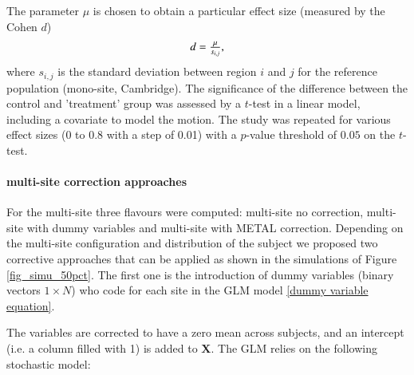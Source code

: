\documentclass[authoryear]{elsarticle}
\begin{document}
The parameter $\mu$ is chosen to obtain a particular effect size (measured by the Cohen $d$)
\begin{equation}\label{cohen's d}
    \begin{array}{l l}
      d = \frac{\mu}{s_{i,j}},      
    \end{array}
\end{equation}
where $s_{i,j}$ is the standard deviation between region $i$ and $j$ for the reference population (mono-site, Cambridge). The significance of the difference between the control and 'treatment' group was assessed by a $t$-test in a linear model, including a covariate to model the motion. The study was repeated for various effect sizes (0 to 0.8 with a step of 0.01) with a $p$-value threshold of $0.05$ on the $t$-test.


\paragraph{multi-site correction approaches} 

For the multi-site three flavours were computed: multi-site no correction, multi-site with dummy variables and multi-site with METAL correction.
Depending on the multi-site configuration and distribution of the subject we proposed two corrective approaches that can be applied as shown in the simulations of Figure \ref{fig_simu_50pct}. The first one is the introduction of dummy variables (binary vectors $1\times N$) who code for each site in the GLM model \ref{dummy variable equation}.

The variables are corrected to have a zero mean across subjects, and an intercept (i.e. a column filled with 1) is added to $\mathbf{X}$. The GLM relies on the following stochastic model:
\end{document}
